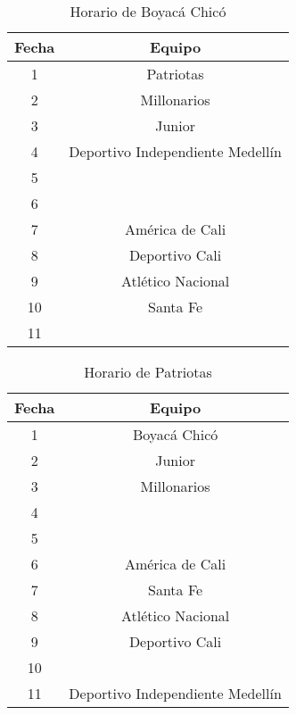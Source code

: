 \documentclass[11pt]{article}
\begin{document}
\begin{multicols}{2}
            \begin{table}[H]
                \centering
                \begin{tabular}{|c||c|}
                    \hline
                    Fecha & Equipo\\ \hline
                    1 & Patriotas\\ \hline
                    2 & Millonarios \\ \hline
                    3 & Junior \\ \hline
                    4 & Deportivo Independiente Medellín \\ \hline
                    5 &  \\ \hline
                    6 &  \\ \hline
                    7 & América de Cali \\ \hline
                    8 & Deportivo Cali\\ \hline
                    9 & Atlético Nacional \\ \hline
                    10 & Santa Fe \\ \hline
                    11 &  \\ \hline
                \end{tabular} 
                \caption{Horario de Boyacá Chicó}
            \end{table}

            \begin{table}[H]
                \centering
                \begin{tabular}{|c||c|}
                    \hline
                    Fecha & Equipo\\ \hline
                    1 & Boyacá Chicó\\ \hline
                    2 & Junior \\ \hline
                    3 & Millonarios \\ \hline
                    4 &  \\ \hline
                    5 &  \\ \hline
                    6 & América de Cali \\ \hline
                    7 & Santa Fe \\ \hline
                    8 & Atlético Nacional\\ \hline
                    9 & Deportivo Cali \\ \hline
                    10 &  \\ \hline
                    11 & Deportivo Independiente Medellín \\ \hline
                \end{tabular} 
                \caption{Horario de Patriotas}
            \end{table}


\end{multicols}
\end{document}
